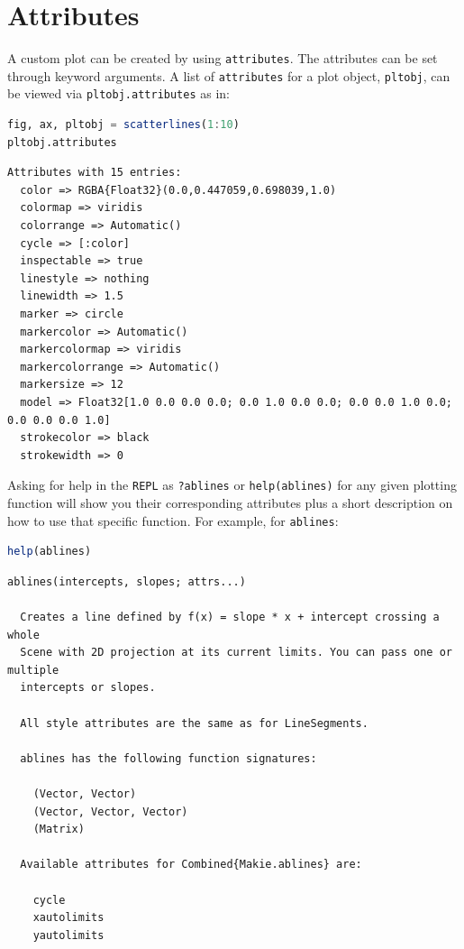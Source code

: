 \documentclass[
  notoc %
]{tufte-book}
\newcommand{\passthrough}[1]{#1}
\begin{document}
\hypertarget{sec:datavisMakie_attributes}{%
\section{Attributes}\label{sec:datavisMakie_attributes}}

A custom plot can be created by using
\passthrough{\lstinline!attributes!}. The attributes can be set through
keyword arguments. A list of \passthrough{\lstinline!attributes!} for a
plot object, \passthrough{\lstinline!pltobj!}, can be viewed via
\passthrough{\lstinline!pltobj.attributes!} as in:

\begin{lstlisting}[language=Julia]
fig, ax, pltobj = scatterlines(1:10)
pltobj.attributes
\end{lstlisting}

\begin{lstlisting}[language=Output]
Attributes with 15 entries:
  color => RGBA{Float32}(0.0,0.447059,0.698039,1.0)
  colormap => viridis
  colorrange => Automatic()
  cycle => [:color]
  inspectable => true
  linestyle => nothing
  linewidth => 1.5
  marker => circle
  markercolor => Automatic()
  markercolormap => viridis
  markercolorrange => Automatic()
  markersize => 12
  model => Float32[1.0 0.0 0.0 0.0; 0.0 1.0 0.0 0.0; 0.0 0.0 1.0 0.0; 0.0 0.0 0.0 1.0]
  strokecolor => black
  strokewidth => 0
\end{lstlisting}

Asking for help in the \passthrough{\lstinline!REPL!} as
\passthrough{\lstinline!?ablines!} or
\passthrough{\lstinline!help(ablines)!} for any given plotting function
will show you their corresponding attributes plus a short description on
how to use that specific function. For example, for
\passthrough{\lstinline!ablines!}:

\begin{lstlisting}[language=Julia]
help(ablines)
\end{lstlisting}

\begin{lstlisting}[language=Output]
  ablines(intercepts, slopes; attrs...)

  Creates a line defined by f(x) = slope * x + intercept crossing a whole
  Scene with 2D projection at its current limits. You can pass one or multiple
  intercepts or slopes.

  All style attributes are the same as for LineSegments.

  ablines has the following function signatures:

    (Vector, Vector)
    (Vector, Vector, Vector)
    (Matrix)

  Available attributes for Combined{Makie.ablines} are:

    cycle
    xautolimits
    yautolimits
\end{lstlisting}
\end{document}
